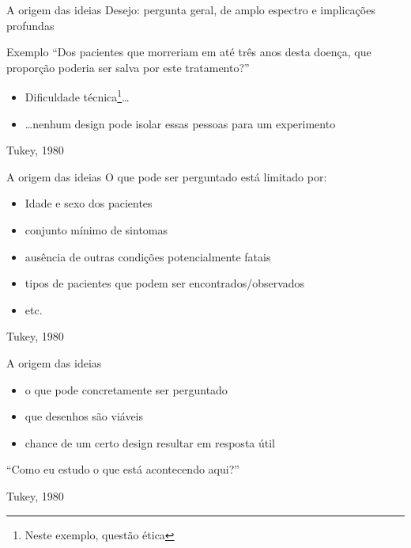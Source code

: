 \documentclass{beamer}
\begin{document}
\begin{frame}{A origem das ideias}
  \scriptsize
  Desejo: pergunta geral, de amplo espectro e implicações profundas
  \bigskip
  \begin{exampleblock}{Exemplo}
    \scriptsize
    ``Dos pacientes que morreriam em até três anos desta doença, que
    proporção poderia ser salva por este tratamento?''
  \end{exampleblock}
  \bigskip
  \begin{itemize}
    \footnotesize
  \item Dificuldade técnica\footnote{Neste exemplo, questão ética}\ldots
    \bigskip
  \item \ldots nenhum design pode isolar essas pessoas para um experimento
  \end{itemize}

  \vfill
  \scriptsize
  \hfill Tukey, 1980
\end{frame}

\begin{frame}{A origem das ideias}
  \scriptsize
  O que \alert{pode} ser perguntado está limitado por:
  \bigskip
  \begin{itemize}
    \footnotesize
  \item Idade e sexo dos pacientes
    \bigskip
  \item conjunto mínimo de sintomas
    \bigskip
  \item ausência de outras condições potencialmente fatais
    \bigskip
  \item tipos de pacientes que podem ser encontrados/observados
    \bigskip
  \item etc.
  \end{itemize}

  \vfill
  \scriptsize
  \hfill Tukey, 1980
\end{frame}

\begin{frame}{A origem das ideias}
  \begin{itemize}
    \footnotesize
  \item o que pode concretamente ser perguntado
    \bigskip
  \item que desenhos são viáveis
    \bigskip
  \item chance de um certo design resultar em resposta útil
  \end{itemize}
  \bigskip
  \begin{block}{}
    { ``Como eu estudo o que está acontecendo aqui?''}
  \end{block}

  \vfill
  \scriptsize
  \hfill Tukey, 1980
\end{frame}
\end{document}
